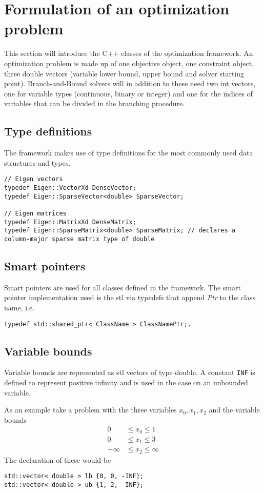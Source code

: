 \section{Formulation of an optimization problem}

This section will introduce the C++ classes of the optimization framework. An optimization problem is made up of one objective object, one constraint object, three double vectors (variable lower bound, upper bound and solver starting point). Branch-and-Bound solvers will in addition to these need two int vectors, one for variable types (continuous, binary or integer) and one for the indices of variables that can be divided in the branching procedure.  

\subsection{Type definitions}
The framework makes use of type definitions for the most commonly used data structures and types. 

\begin{lstlisting}
// Eigen vectors
typedef Eigen::VectorXd DenseVector;
typedef Eigen::SparseVector<double> SparseVector;

// Eigen matrices
typedef Eigen::MatrixXd DenseMatrix;
typedef Eigen::SparseMatrix<double> SparseMatrix; // declares a column-major sparse matrix type of double
\end{lstlisting}

\subsection{Smart pointers}
Smart pointers are used for all classes defined in the framework. The smart pointer implementation used is the stl  via typedefs that append \textit{Ptr} to the class name, i.e.
\begin{lstlisting}
typedef std::shared_ptr< ClassName > ClassNamePtr;.
\end{lstlisting}

\subsection{Variable bounds}

Variable bounds are represented as stl vectors of type double. A constant \texttt{INF} is defined to represent positive infinity and is used in the case on an unbounded variable.

As an example take a problem with the three variables $x_{0}, x_{1}, x_{2}$ and the variable bounds 
\begin{align*}
0 &\leq x_{0} \leq 1 \\
0 &\leq x_{1} \leq 3 \\
-\infty &\leq x_{2} \leq \infty
\end{align*}
The declaration of these would be
\begin{lstlisting}
std::vector< double > lb {0, 0, -INF};
std::vector< double > ub {1, 2,  INF};
\end{lstlisting}


